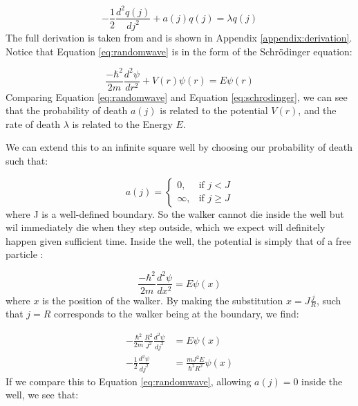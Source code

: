 \documentclass[journal]{IEEEtran}
\begin{document}
\begin{equation}
  -\frac{1}{2} \frac{d^2q(j)}{dj^2} + a(j)q(j) = \lambda q(j)
  \label{eq:randomwave}
\end{equation}
The full derivation is taken from \cite{MarcusNewton2020} and is shown in
Appendix \ref{appendix:derivation}. Notice that Equation \ref{eq:randomwave} is
in the form of the Schr\"{o}dinger equation:

\begin{equation}
  \label{eq:schrodinger}
  \frac{-\hbar^2}{2m}\frac{d^2 \psi}{dr^2} + V(r)\psi(r) = E\psi(r)
\end{equation}
Comparing Equation \ref{eq:randomwave} and Equation \ref{eq:schrodinger}, we can
see that the probability of death $a(j)$ is related to the potential $V(r)$,
and the rate of death $\lambda$ is related to the Energy $E$.

We can extend this to an infinite square well by choosing our probability of
death such that:

\begin{equation}
  \label{eq:squarewell}
    a(j) =
    \begin{cases}
      0,& \text{if } j < J\\
      \infty,& \text{if } j \geq J
    \end{cases}
    \nonumber
\end{equation}
where J is a well-defined boundary. So the walker cannot die inside the well but
wil immediately die when they step outside, which we expect will definitely
happen given sufficient time. Inside the well, the potential is simply that of a
free particle \cite{Bransden2003}:

\begin{equation}
  \frac{-\hbar^2}{2m}\frac{d^2 \psi}{dx^2} = E\psi(x)
  \nonumber
\end{equation}
where $x$ is the position of the walker. By making the substitution
$x=J\frac{j}{R}$, such that $j=R$ corresponds to the walker being at the
boundary, we find:

\begin{equation}
  \begin{split}
    -\frac{\hbar^2}{2m}\frac{R^2}{J^2}\frac{d^2\psi}{dj^2} &= E\psi(x)\\
    -\frac{1}{2}\frac{d^2\psi}{dj^2} &= \frac{mJ^2E}{\hbar^2R^2}\psi(x)
  \end{split}
  \nonumber
\end{equation}
If we compare this to Equation \ref{eq:randomwave}, allowing $a(j) = 0$ inside
the well, we see that:
\end{document}
